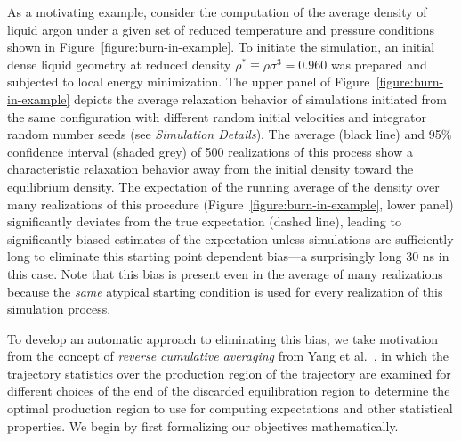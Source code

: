 \documentclass[aps,pre,twocolumn,nofootinbib,superscriptaddress,linenumbers,11point]{revtex4-1}
\begin{document}
As a motivating example, consider the computation of the average density of liquid argon under a given set of reduced temperature and pressure conditions shown in Figure~\ref{figure:burn-in-example}.
To initiate the simulation, an initial dense liquid geometry at reduced density $\rho^* \equiv \rho \sigma^3 = 0.960$ was prepared and subjected to local energy minimization.
The upper panel of Figure~\ref{figure:burn-in-example} depicts the average relaxation behavior of simulations initiated from the same configuration with different random initial velocities and integrator random number seeds (see \emph{Simulation Details}).
The average (black line) and 95\% confidence interval (shaded grey) of 500 realizations of this process show a characteristic relaxation behavior away from the initial density toward the equilibrium density.
The expectation of the running average of the density over many realizations of this procedure ({Figure~\ref{figure:burn-in-example}, lower panel}) significantly deviates from the true expectation (dashed line), leading to significantly biased estimates of the expectation unless simulations are sufficiently long to eliminate this starting point dependent bias---a surprisingly long 30 ns in this case.
Note that this bias is present even in the average of many realizations because the \emph{same} atypical starting condition is used for every realization of this simulation process.

To develop an automatic approach to eliminating this bias, we take motivation from the concept of \emph{reverse cumulative averaging} from Yang et al.~\cite{yang-karplus:2004:jcp:reverse-cumulative-averaging}, in which the trajectory statistics over the production region of the trajectory are examined for different choices of the end of the discarded equilibration region to determine the optimal production region to use for computing expectations and other statistical properties.
We begin by first formalizing our objectives mathematically.

\end{document}
